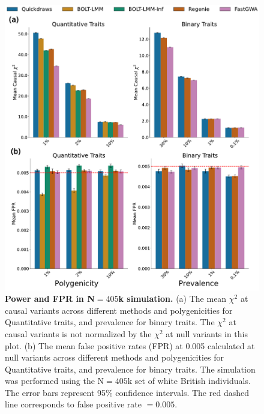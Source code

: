 \begin{figure}[h!]
    \centering
    \includegraphics[width=\textwidth]{figures/qd_panel_sim.pdf}
    \caption{\textbf{Power and FPR in N$=405$k simulation.}
    (a) The mean $\chi^2$ at causal variants across different methods and polygenicities for Quantitative traits, and prevalence for binary traits. The $\chi^2$ at causal variants is not normalized by the $\chi^2$ at null variants in this plot.
    (b) The mean false positive rates (FPR) at 0.005 calculated at null variants across different methods and polygenicities for Quantitative traits, and prevalence for binary traits.
    The simulation was performed using the N$=405$k set of white British individuals. The error bars represent 95\% confidence intervals.
    The red dashed line corresponds to false positive rate $=0.005$.
    }
    \label{fig:sim_400k}
\end{figure}

